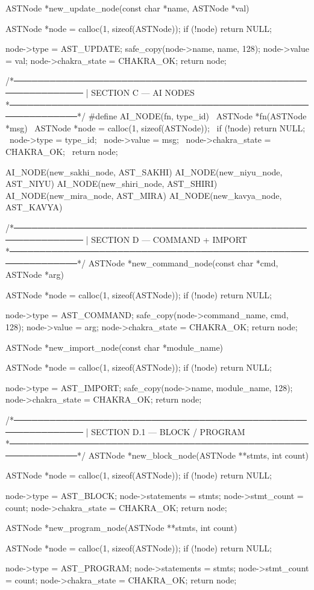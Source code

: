 \documentclass{article}
\begin{document}
ASTNode *new_update_node(const char *name, ASTNode *val)
{
    ASTNode *node = calloc(1, sizeof(ASTNode));
    if (!node) return NULL;

    node->type = AST_UPDATE;
    safe_copy(node->name, name, 128);
    node->value = val;
    node->chakra_state = CHAKRA_OK;
    return node;
}

/*──────────────────────────────────────────────────────────────
 | SECTION C — AI NODES
 *──────────────────────────────────────────────────────────────*/
#define AI_NODE(fn, type_id)                      \
ASTNode *fn(ASTNode *msg) {                       \
    ASTNode *node = calloc(1, sizeof(ASTNode));   \
    if (!node) return NULL;                       \
    node->type = type_id;                         \
    node->value = msg;                            \
    node->chakra_state = CHAKRA_OK;               \
    return node;                                  \
}

AI_NODE(new_sakhi_node, AST_SAKHI)
AI_NODE(new_niyu_node,  AST_NIYU)
AI_NODE(new_shiri_node, AST_SHIRI)
AI_NODE(new_mira_node,  AST_MIRA)
AI_NODE(new_kavya_node, AST_KAVYA)

/*──────────────────────────────────────────────────────────────
 | SECTION D — COMMAND + IMPORT
 *──────────────────────────────────────────────────────────────*/
ASTNode *new_command_node(const char *cmd, ASTNode *arg)
{
    ASTNode *node = calloc(1, sizeof(ASTNode));
    if (!node) return NULL;

    node->type = AST_COMMAND;
    safe_copy(node->command_name, cmd, 128);
    node->value = arg;
    node->chakra_state = CHAKRA_OK;
    return node;
}

ASTNode *new_import_node(const char *module_name)
{
    ASTNode *node = calloc(1, sizeof(ASTNode));
    if (!node) return NULL;

    node->type = AST_IMPORT;
    safe_copy(node->name, module_name, 128);
    node->chakra_state = CHAKRA_OK;
    return node;
}

/*──────────────────────────────────────────────────────────────
 | SECTION D.1 — BLOCK / PROGRAM
 *──────────────────────────────────────────────────────────────*/
ASTNode *new_block_node(ASTNode **stmts, int count)
{
    ASTNode *node = calloc(1, sizeof(ASTNode));
    if (!node) return NULL;

    node->type = AST_BLOCK;
    node->statements = stmts;
    node->stmt_count = count;
    node->chakra_state = CHAKRA_OK;
    return node;
}

ASTNode *new_program_node(ASTNode **stmts, int count)
{
    ASTNode *node = calloc(1, sizeof(ASTNode));
    if (!node) return NULL;

    node->type = AST_PROGRAM;
    node->statements = stmts;
    node->stmt_count = count;
    node->chakra_state = CHAKRA_OK;
    return node;
}
\end{document}
